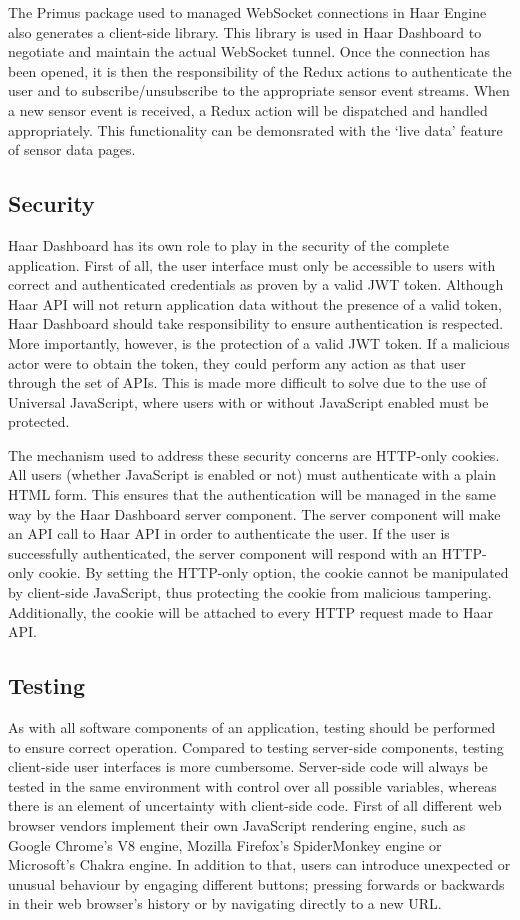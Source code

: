       The Primus package used to managed WebSocket connections in Haar Engine also generates a client-side library. This library is used in Haar Dashboard to negotiate and maintain the actual WebSocket tunnel. Once the connection has been opened, it is then the responsibility of the Redux actions to authenticate the user and to subscribe/unsubscribe to the appropriate sensor event streams. When a new sensor event is received, a Redux action will be dispatched and handled appropriately. This functionality can be demonsrated with the `live data' feature of sensor data pages.

    \subsection{Security}
      Haar Dashboard has its own role to play in the security of the complete application. First of all, the user interface must only be accessible to users with correct and authenticated credentials as proven by a valid JWT token. Although Haar API will not return application data without the presence of a valid token, Haar Dashboard should take responsibility to ensure authentication is respected. More importantly, however, is the protection of a valid JWT token. If a malicious actor were to obtain the token, they could perform any action as that user through the set of APIs. This is made more difficult to solve due to the use of Universal JavaScript, where users with or without JavaScript enabled must be protected.

      The mechanism used to address these security concerns are HTTP-only cookies. All users (whether JavaScript is enabled or not) must authenticate with a plain HTML form. This ensures that the authentication will be managed in the same way by the Haar Dashboard server component. The server component will make an API call to Haar API in order to authenticate the user. If the user is successfully authenticated, the server component will respond with an HTTP-only cookie. By setting the HTTP-only option, the cookie cannot be manipulated by client-side JavaScript, thus protecting the cookie from malicious tampering. Additionally, the cookie will be attached to every HTTP request made to Haar API.

    \subsection{Testing}
      As with all software components of an application, testing should be performed to ensure correct operation. Compared to testing server-side components, testing client-side user interfaces is more cumbersome. Server-side code will always be tested in the same environment with control over all possible variables, whereas there is an element of uncertainty with client-side code. First of all different web browser vendors implement their own JavaScript rendering engine, such as Google Chrome's V8 engine, Mozilla Firefox's SpiderMonkey engine or Microsoft's Chakra engine. In addition to that, users can introduce unexpected or unusual behaviour by engaging different buttons; pressing forwards or backwards in their web browser's history or by navigating directly to a new URL.

